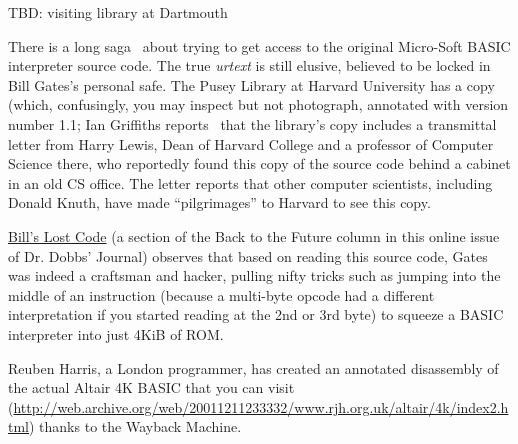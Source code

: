 
TBD: visiting library at Dartmouth

There is a long saga~\cite{raiders} about trying to get access to the original
Micro-Soft BASIC interpreter source code.
The true \emph{urtext\/} is still elusive, believed to be locked in Bill Gates's
personal safe.
The Pusey Library at Harvard University has a copy (which, confusingly, you may
inspect but not photograph, annotated with version number 1.1;
Ian Griffiths reports~\cite{ians_trip} that the library's copy includes
a transmittal letter from 
Harry Lewis, Dean of Harvard College and a professor of Computer
Science there, who reportedly found this copy of the source code behind
a cabinet in an old CS office.
The letter reports that other computer scientists, including Donald
Knuth, have made ``pilgrimages'' to Harvard to see this copy.

\href{http://www.drdobbs.com/back-to-the-future/184404733}{Bill's
  Lost Code} (a section of the Back to the Future column in this online
issue of Dr. Dobbs' Journal) observes that based on reading this source
code, Gates was indeed a craftsman and hacker, pulling nifty tricks such
as jumping into the middle of an instruction (because a multi-byte
opcode had a different interpretation if you started reading at the 2nd
or 3rd byte) to squeeze a BASIC interpreter into just 4KiB of ROM.


Reuben Harris, a London programmer, has created an
annotated
disassembly of the actual Altair 4K BASIC 
that you can visit (\url{http://web.archive.org/web/20011211233332/www.rjh.org.uk/altair/4k/index2.html}) thanks to the
Wayback Machine.
